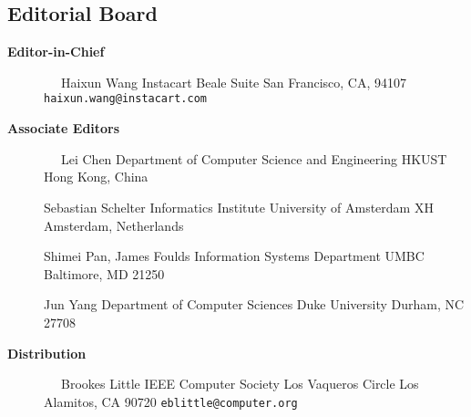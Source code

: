 \documentclass[10pt,twocolumn]{article}
\begin{document}
\pagestyle{empty}

\subsection*{Editorial Board}

\begin{description}
\item[{\bf Editor-in-Chief}]
\verb-  -                      \newline
Haixun Wang                 \newline
Instacart              Beale Suite\newline
San Francisco, CA, 94107\newline
\verb+haixun.wang@instacart.com+     \newline
\vspace{-.2cm}

\item[{\bf Associate Editors}] 
\verb-  -                     \newline
Lei Chen\newline
Department of Computer Science and Engineering\newline
HKUST\newline
Hong Kong, China\newline

\vspace{-.4cm}
Sebastian Schelter\newline
Informatics Institute\newline
University of Amsterdam XH Amsterdam, Netherlands\newline

\vspace{-.4cm}
Shimei Pan, James Foulds\newline
Information Systems Department\newline 
UMBC\newline
Baltimore, MD 21250\newline

\vspace{-.4cm}
Jun Yang\newline
Department of Computer Sciences \newline 
Duke University\newline
Durham, NC 27708\newline
\vspace{-.4cm}

\item[{\bf Distribution}]      
\verb-  -                      \newline
Brookes Little           \newline
IEEE Computer Society           Los Vaqueros Circle       \newline
Los Alamitos, CA 90720     \newline
\verb+eblittle@computer.org+     \newline
\vspace{-.4cm}		            
\end{description}
\end{document}

